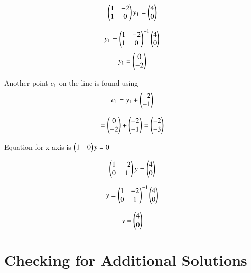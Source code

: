 \documentclass[journal,12pt,twocolumn]{IEEEtran}
\begin{document}
\begin{align}
    \begin{pmatrix}
1 & -2\\
1 & 0 
\end{pmatrix}y_1 =  \begin{pmatrix} 4\\
0
\end{pmatrix}
\end{align}

\begin{align}
    y_1 =  \begin{pmatrix}
1 & -2\\
1 & 0 
\end{pmatrix}^{-1}\begin{pmatrix} 4\\
0
\end{pmatrix}
\end{align}
\begin{align}
    y_1 =  \begin{pmatrix} 0\\
-2
\end{pmatrix}
\end{align}

Another point $c_1$ on the line is found using 
\begin{align}
c_1 = y_1 + \begin{pmatrix} -2\\
-1
\end{pmatrix}
\end{align}

\begin{align}
    = \begin{pmatrix} 0\\
-2
\end{pmatrix} + \begin{pmatrix} -2\\
-1
\end{pmatrix} = \begin{pmatrix} -2\\
-3
\end{pmatrix}
\end{align}

Equation for x axis is $\begin{pmatrix}1 & 0\end{pmatrix}y=0$

\begin{align}
    \begin{pmatrix}
1 & -2\\
0 & 1 
\end{pmatrix}y =  \begin{pmatrix} 4\\
0
\end{pmatrix}
\end{align}

\begin{align}
    y =  \begin{pmatrix}
1 & -2\\0 & 1 
\end{pmatrix}^{-1}\begin{pmatrix} 4\\
0
\end{pmatrix}
\end{align}

\begin{align}
    y = 
\begin{pmatrix} 4\\
0
\end{pmatrix}
\end{align}


\section{Checking for Additional Solutions}
\end{document}
